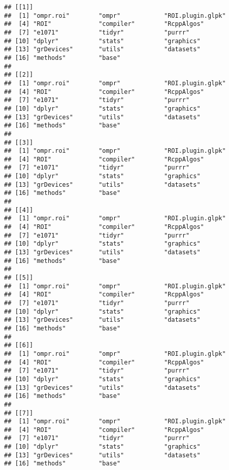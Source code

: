 \documentclass[]{article}
\begin{document}
\begin{verbatim}
## [[1]]
##  [1] "ompr.roi"        "ompr"            "ROI.plugin.glpk"
##  [4] "ROI"             "compiler"        "RcppAlgos"      
##  [7] "e1071"           "tidyr"           "purrr"          
## [10] "dplyr"           "stats"           "graphics"       
## [13] "grDevices"       "utils"           "datasets"       
## [16] "methods"         "base"           
## 
## [[2]]
##  [1] "ompr.roi"        "ompr"            "ROI.plugin.glpk"
##  [4] "ROI"             "compiler"        "RcppAlgos"      
##  [7] "e1071"           "tidyr"           "purrr"          
## [10] "dplyr"           "stats"           "graphics"       
## [13] "grDevices"       "utils"           "datasets"       
## [16] "methods"         "base"           
## 
## [[3]]
##  [1] "ompr.roi"        "ompr"            "ROI.plugin.glpk"
##  [4] "ROI"             "compiler"        "RcppAlgos"      
##  [7] "e1071"           "tidyr"           "purrr"          
## [10] "dplyr"           "stats"           "graphics"       
## [13] "grDevices"       "utils"           "datasets"       
## [16] "methods"         "base"           
## 
## [[4]]
##  [1] "ompr.roi"        "ompr"            "ROI.plugin.glpk"
##  [4] "ROI"             "compiler"        "RcppAlgos"      
##  [7] "e1071"           "tidyr"           "purrr"          
## [10] "dplyr"           "stats"           "graphics"       
## [13] "grDevices"       "utils"           "datasets"       
## [16] "methods"         "base"           
## 
## [[5]]
##  [1] "ompr.roi"        "ompr"            "ROI.plugin.glpk"
##  [4] "ROI"             "compiler"        "RcppAlgos"      
##  [7] "e1071"           "tidyr"           "purrr"          
## [10] "dplyr"           "stats"           "graphics"       
## [13] "grDevices"       "utils"           "datasets"       
## [16] "methods"         "base"           
## 
## [[6]]
##  [1] "ompr.roi"        "ompr"            "ROI.plugin.glpk"
##  [4] "ROI"             "compiler"        "RcppAlgos"      
##  [7] "e1071"           "tidyr"           "purrr"          
## [10] "dplyr"           "stats"           "graphics"       
## [13] "grDevices"       "utils"           "datasets"       
## [16] "methods"         "base"           
## 
## [[7]]
##  [1] "ompr.roi"        "ompr"            "ROI.plugin.glpk"
##  [4] "ROI"             "compiler"        "RcppAlgos"      
##  [7] "e1071"           "tidyr"           "purrr"          
## [10] "dplyr"           "stats"           "graphics"       
## [13] "grDevices"       "utils"           "datasets"       
## [16] "methods"         "base"           

\end{verbatim}
\end{document}
